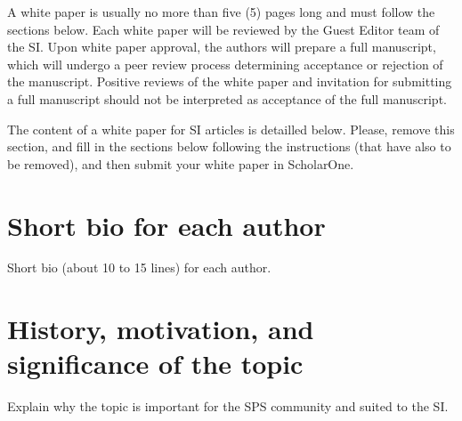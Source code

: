 \documentclass[journal,onecolumn]{IEEEtran}
\begin{document}
A white paper is usually no more than five (5) pages long and must follow the sections below.  Each white paper will be reviewed by the Guest Editor team of the SI. Upon white paper approval, the authors will prepare a full manuscript, which will undergo a peer review process determining acceptance or rejection of the manuscript. Positive reviews of the white paper and invitation for submitting a full manuscript should not be interpreted as acceptance of the full manuscript. 

{\color{blue} The content of a white paper for SI articles is detailled below. Please, remove this section, and fill in the sections below following the instructions (that have also to be removed), and then submit your white paper in ScholarOne.}

\section{Short bio for each author}
\par Short bio (about 10 to 15 lines) for each author. 

\section{History, motivation, and significance of the topic}
\label{secrel}
\par Explain why the topic is important for the SPS community and suited to the SI.
\end{document}
